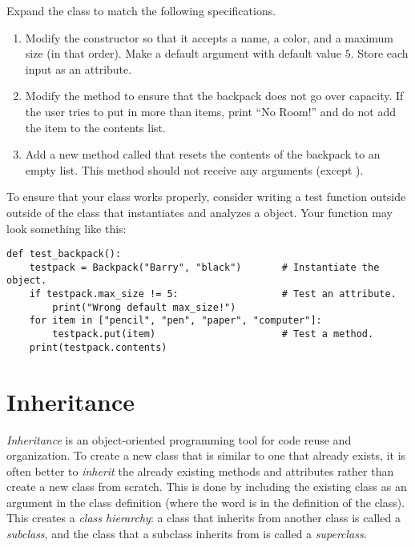 \begin{problem}
Expand the  class to match the following specifications.
\begin{enumerate}
\item Modify the constructor so that it accepts a name, a color, and a maximum size (in that order).
Make  a default argument with default value $5$.
Store each input as an attribute.

\item Modify the  method to ensure that the backpack does not go over capacity.
If the user tries to put in more than  items, print ``No Room!'' and do not add the item to the contents list.

\item Add a new method called  that resets the contents of the backpack to an empty list.
This method should not receive any arguments (except ).
\end{enumerate}

To ensure that your class works properly, consider writing a test function outside outside of the  class that instantiates and analyzes a  object.
Your function may look something like this:
\begin{lstlisting}
def test_backpack():
    testpack = Backpack("Barry", "black")       # Instantiate the object.
    if testpack.max_size != 5:                  # Test an attribute.
        print("Wrong default max_size!")
    for item in ["pencil", "pen", "paper", "computer"]:
        testpack.put(item)                      # Test a method.
    print(testpack.contents)
\end{lstlisting}
\end{problem}

\section*{Inheritance} %

\emph{Inheritance} is an object-oriented programming tool for code reuse and organization.
To create a new class that is similar to one that already exists, it is often better to \emph{inherit} the already existing methods and attributes rather than create a new class from scratch.
This is done by including the existing class as an argument in the class definition (where the word  is in the definition of the  class).
This creates a \emph{class hierarchy}: a class that inherits from another class is called a \emph{subclass}, and the class that a subclass inherits from is called a \emph{superclass}.

